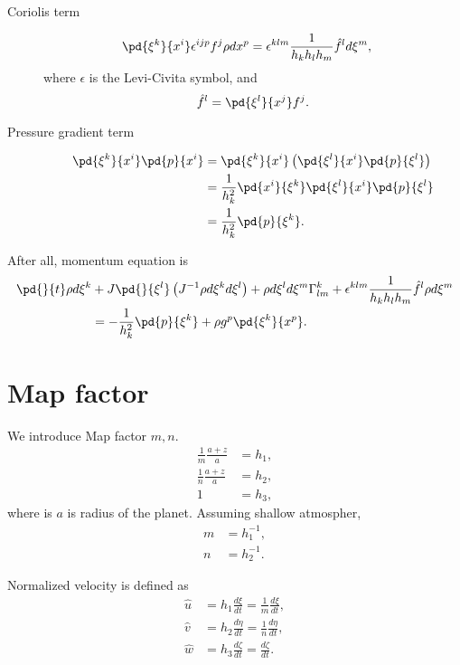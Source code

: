 \begin{description}
\item[Coriolis term]
\begin{align}
  \pd{\xi^k}{x^i} \epsilon^{ijp} f^j \rho dx^p
  &= \epsilon^{klm} \frac{1}{h_kh_lh_m}\hat{f}^l d\xi^m,
\end{align}
where $\epsilon$ is the Levi-Civita symbol,
and
\begin{equation}
  \hat{f}^l = \pd{\xi^l}{x^j} f^j.
\end{equation}

\item[Pressure gradient term]
\begin{align}
  \pd{\xi^k}{x^i} \pd{p}{x^i}
  &= \pd{\xi^k}{x^i}\left(\pd{\xi^l}{x^i}\pd{p}{\xi^l}\right)\nonumber\\
  &= \frac{1}{h_k^2}\pd{x^i}{\xi^k}\pd{\xi^l}{x^i}\pd{p}{\xi^l} \nonumber\\
  &= \frac{1}{h_k^2}\pd{p}{\xi^k}.
\end{align}

\end{description}

After all, momentum equation is
\begin{align}
  \pd{}{t} \rho d\xi^k &+ J\pd{}{\xi^l} \left( J^{-1} \rho d\xi^k d\xi^l \right)
  + \rho d\xi^l d\xi^m \Gamma_{lm}^k
 + \epsilon^{klm} \frac{1}{h_kh_lh_m}\hat{f}^l \rho d\xi^m \nonumber\\
 &= -\frac{1}{h_k^2}\pd{p}{\xi^k} + \rho g^p \pd{\xi^k}{x^p}.
\end{align}



\section{Map factor}
We introduce Map factor $m, n$.
\begin{align}
  \frac{1}{m}\frac{a+z}{a} &= h_1, \\
  \frac{1}{n}\frac{a+z}{a} &= h_2, \\
  1 &= h_3,
\end{align}
where is $a$ is radius of the planet.
Assuming shallow atmospher,
\begin{align}
  m &= h_1^{-1}, \\
  n &= h_2^{-1}.
\end{align}

Normalized velocity is defined as
\begin{align}
  \hat{u} &= h_1\frac{d \xi}{dt} = \frac{1}{m}\frac{d \xi}{dt}, \\
  \hat{v} &= h_2\frac{d \eta}{dt} = \frac{1}{n}\frac{d \eta}{dt}, \\
  \hat{w} &= h_3\frac{d \zeta}{dt} = \frac{d \zeta}{dt}.
\end{align}

